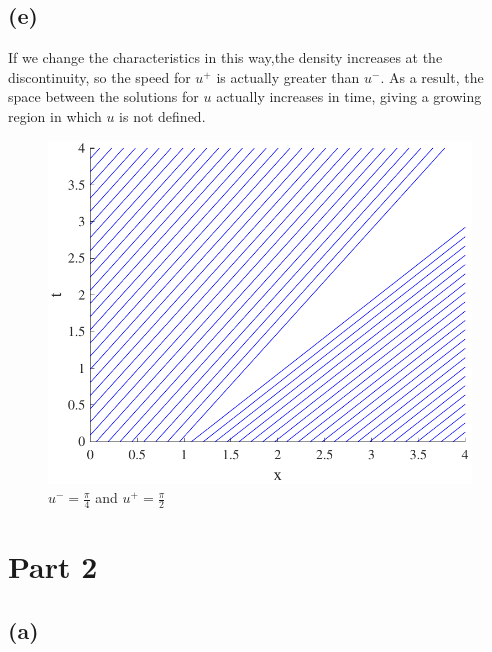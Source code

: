 \documentclass{article}
\begin{document}
\subsection*{(e)}
If we change the characteristics in this way,the density increases at the discontinuity, so the speed for $u^+$ is actually greater than $u^-$. As a result, the space between the solutions for $u$ actually increases in time, giving a growing region in which $u$ is not defined.
\begin{figure}[!htbp]
  \centering
    \includegraphics[width=\textwidth]{hw_14_plot2.pdf}
    \caption{$u^-=\frac{\pi}{4}$ and $u^+=\frac{\pi}{2}$}
\end{figure}
\FloatBarrier
\section*{Part 2}
\subsection*{(a)}
\end{document}
